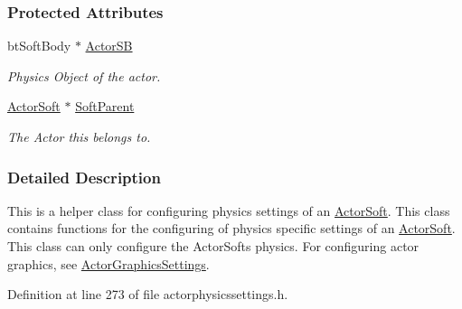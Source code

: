 \subsubsection*{Protected Attributes}
\begin{DoxyCompactItemize}
\item 
\hypertarget{classphys_1_1ActorSoftPhysicsSettings_a0258a8c8ab634b6dc26fd86e8edcc25c}{
btSoftBody $\ast$ \hyperlink{classphys_1_1ActorSoftPhysicsSettings_a0258a8c8ab634b6dc26fd86e8edcc25c}{ActorSB}}
\label{classphys_1_1ActorSoftPhysicsSettings_a0258a8c8ab634b6dc26fd86e8edcc25c}

\begin{DoxyCompactList}\small\item\em Physics Object of the actor. \item\end{DoxyCompactList}\item 
\hypertarget{classphys_1_1ActorSoftPhysicsSettings_a94194a1dd89e643b02181010fcad6bc3}{
\hyperlink{classphys_1_1ActorSoft}{ActorSoft} $\ast$ \hyperlink{classphys_1_1ActorSoftPhysicsSettings_a94194a1dd89e643b02181010fcad6bc3}{SoftParent}}
\label{classphys_1_1ActorSoftPhysicsSettings_a94194a1dd89e643b02181010fcad6bc3}

\begin{DoxyCompactList}\small\item\em The Actor this belongs to. \item\end{DoxyCompactList}\end{DoxyCompactItemize}


\subsubsection{Detailed Description}
This is a helper class for configuring physics settings of an \hyperlink{classphys_1_1ActorSoft}{ActorSoft}. This class contains functions for the configuring of physics specific settings of an \hyperlink{classphys_1_1ActorSoft}{ActorSoft}. This class can only configure the ActorSofts physics. For configuring actor graphics, see \hyperlink{classphys_1_1ActorGraphicsSettings}{ActorGraphicsSettings}. 

Definition at line 273 of file actorphysicssettings.h.



